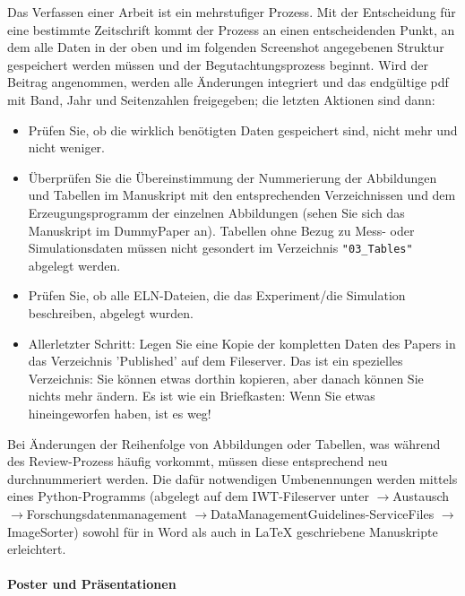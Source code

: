 Das Verfassen einer Arbeit ist ein mehrstufiger Prozess. Mit der Entscheidung für eine bestimmte Zeitschrift kommt der Prozess an einen entscheidenden Punkt, an dem alle Daten in der oben und im folgenden Screenshot angegebenen Struktur gespeichert werden müssen und der Begutachtungsprozess beginnt. Wird der Beitrag
angenommen, werden alle Änderungen integriert und das endgültige pdf mit Band, Jahr und Seitenzahlen freigegeben; die letzten Aktionen sind dann:
\begin{itemize}
  \item Prüfen Sie, ob die wirklich benötigten Daten gespeichert sind, nicht
        mehr und nicht weniger.
  \item Überprüfen Sie die Übereinstimmung der Nummerierung der Abbildungen und
        Tabellen im Manuskript mit den entsprechenden Verzeichnissen und dem
        Erzeugungsprogramm der einzelnen Abbildungen (sehen Sie sich das
        Manuskript im DummyPaper an). Tabellen ohne Bezug zu Mess- oder Simulationsdaten
        müssen nicht gesondert im Verzeichnis \texttt{"03\_Tables"} abgelegt werden.
  \item Prüfen Sie, ob alle ELN-Dateien, die das Experiment/die Simulation
        beschreiben, abgelegt wurden.
  \item Allerletzter Schritt: Legen Sie eine Kopie der kompletten Daten des
        Papers in das Verzeichnis 'Published' auf dem Fileserver. Das ist ein
        spezielles Verzeichnis: Sie können etwas dorthin kopieren, aber danach
        können Sie nichts mehr ändern. Es ist wie ein Briefkasten: Wenn Sie
        etwas hineingeworfen haben, ist es weg!
\end{itemize}

Bei Änderungen der Reihenfolge von Abbildungen oder Tabellen, was während des Review-Prozess häufig vorkommt, müssen diese entsprechend neu durchnummeriert werden. Die dafür notwendigen Umbenennungen werden mittels eines Python-Programms (abgelegt auf dem IWT-Fileserver unter $\rightarrow$Austausch $\rightarrow$Forschungsdatenmanagement $\rightarrow$DataManagement\-Guidelines-ServiceFiles  $\rightarrow$ImageSorter) sowohl für in Word als auch in LaTeX geschriebene Manuskripte erleichtert.


\paragraph{Poster und Präsentationen}


